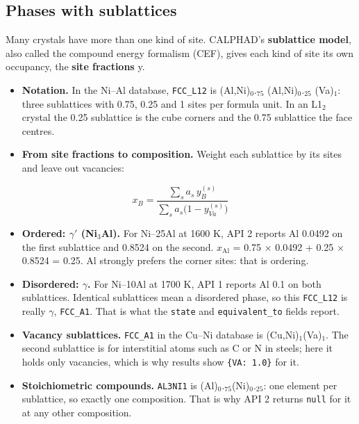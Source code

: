 \documentclass[12pt,a4paper]{article}
\begin{document}
\subsection*{Phases with sublattices}
Many crystals have more than one kind of site. CALPHAD's \textbf{sublattice model}, also called the compound energy formalism (CEF), gives each kind of site its own occupancy, the \textbf{site fractions} y.

\begin{itemize}
\item \textbf{Notation.} In the Ni--Al database, \texttt{FCC\_\allowbreak{}L12} is (Al,Ni)\(_{0}\).\(_{75}\) (Al,Ni)\(_{0}\).\(_{25}\) (Va)\(_{1}\): three sublattices with 0.75, 0.25 and 1 sites per formula unit. In an L1\(_{2}\) crystal the 0.25 sublattice is the cube corners and the 0.75 sublattice the face centres.
\item \textbf{From site fractions to composition.} Weight each sublattice by its sites and leave out vacancies:
\end{itemize}
\begin{equation*}
x_B = \frac{\sum_s a_s\, y_B^{(s)}}{\sum_s a_s \bigl(1 - y_{Va}^{(s)}\bigr)}
\end{equation*}
\begin{itemize}
\item \textbf{Ordered: \(\gamma '\) (Ni\(_{3}\)Al).} For Ni--25Al at 1600 K, API 2 reports Al 0.0492 on the first sublattice and 0.8524 on the second. \(x_{\mathrm{Al}}\) = 0.75 \(\times\) 0.0492 + 0.25 \(\times\) 0.8524 = 0.25. Al strongly prefers the corner sites: that is ordering.
\item \textbf{Disordered: \(\gamma\).} For Ni--10Al at 1700 K, API 1 reports Al 0.1 on both sublattices. Identical sublattices mean a disordered phase, so this \texttt{FCC\_\allowbreak{}L12} is really \(\gamma\), \texttt{FCC\_\allowbreak{}A1}. That is what the \texttt{state} and \texttt{equivalent\_\allowbreak{}to} fields report.
\item \textbf{Vacancy sublattices.} \texttt{FCC\_\allowbreak{}A1} in the Cu--Ni database is (Cu,Ni)\(_{1}\)(Va)\(_{1}\). The second sublattice is for interstitial atoms such as C or N in steels; here it holds only vacancies, which is why results show \texttt{\{\textquotedbl{}VA\textquotedbl{}: 1.\allowbreak{}0\}} for it.
\item \textbf{Stoichiometric compounds.} \texttt{AL3NI1} is (Al)\(_{0}\).\(_{75}\)(Ni)\(_{0}\).\(_{25}\): one element per sublattice, so exactly one composition. That is why API 2 returns \texttt{null} for it at any other composition.
\end{itemize}
\end{document}
